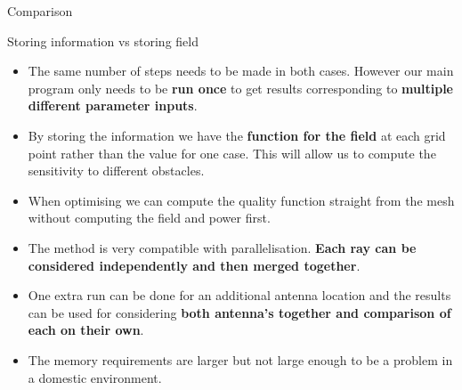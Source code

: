 \documentclass[8pt]{beamer}
\begin{document}
\begin{frame}{Comparison}
\begin{block}{Storing information vs storing field}
\begin{itemize}
\item The same number of steps needs to be made in both cases. However our main program only needs to be \textbf{run once} to get results corresponding to \textbf{multiple different parameter inputs}.
\pause
\item By storing the information we have the \textbf{function for the field} at each grid point rather than the value for one case. This will allow us to compute the sensitivity to different obstacles.
\pause
\item When optimising we can compute the quality function straight from the mesh without computing the field and power first.
\pause
\item The method is very compatible with parallelisation. \textbf{Each ray can be considered independently and then merged together}. 
\pause
\item One extra run can be done for an additional antenna location and the results can be used for considering \textbf{both antenna's together and comparison of each on their own}.
\pause 
\item The memory requirements are larger but not large enough to be a problem in a domestic environment.
\end{itemize}
\end{block}
\end{frame}
\end{document}
